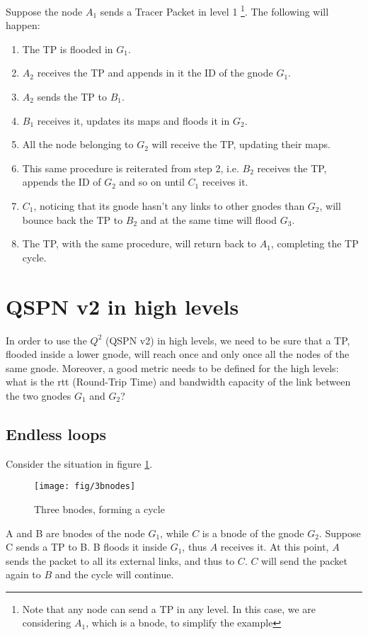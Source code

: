 \documentclass[a4paper]{article}
\begin{document}
Suppose the node $A_1$ sends a Tracer Packet in level 1 
\footnote{Note that any node can send a TP in any level. In this case, we are
considering $A_1$, which is a bnode, to simplify the example}. 
The following will happen:
\begin{enumerate}
	\item The TP is flooded in $G_1$.
	\item $A_2$ receives the TP and appends in it the ID of the gnode
		$G_1$.
	\item $A_2$ sends the TP to $B_1$.
	\item $B_1$ receives it, updates its maps and floods it in $G_2$.
	\item All the node belonging to $G_2$ will receive the TP, updating their
		maps.
	\item This same procedure is reiterated from step 2, i.e. $B_2$ receives
		the TP, appends the ID of $G_2$ and so on until $C_1$ receives
		it.
	\item $C_1$, noticing that its gnode hasn't any links to other gnodes
		than $G_2$, will bounce back the TP to $B_2$ and at the same
		time will flood $G_3$.
	\item The TP, with the same procedure, will return back to $A_1$,
		completing the TP cycle.
\end{enumerate}

\section{QSPN v2 in high levels}
In order to use the $Q^2$ (QSPN v2) in high levels, we need to be sure that a TP,
flooded inside a lower gnode, will reach once and only once all the nodes of
the same gnode. Moreover, a good metric needs to be defined for the high
levels: what is the rtt (Round-Trip Time) and bandwidth capacity of the link
between the two gnodes $G_1$ and $G_2$?

\subsection{Endless loops}
Consider the situation in figure \ref{fig:3bnodes}.
\begin{figure}[h]
	\begin{center}
		\texttt{[image: fig/3bnodes]}
	\end{center}
	\caption{Three bnodes, forming a cycle}
	\label{fig:3bnodes}
\end{figure}
A and B are bnodes of the node $G_1$, while $C$ is a bnode of the gnode $G_2$.
Suppose C sends a TP to B. B floods it inside $G_1$, thus $A$ receives it. At
this point, $A$ sends the packet to all its external links, and thus to $C$.
$C$ will send the packet again to $B$ and the cycle will continue.\\
\end{document}
